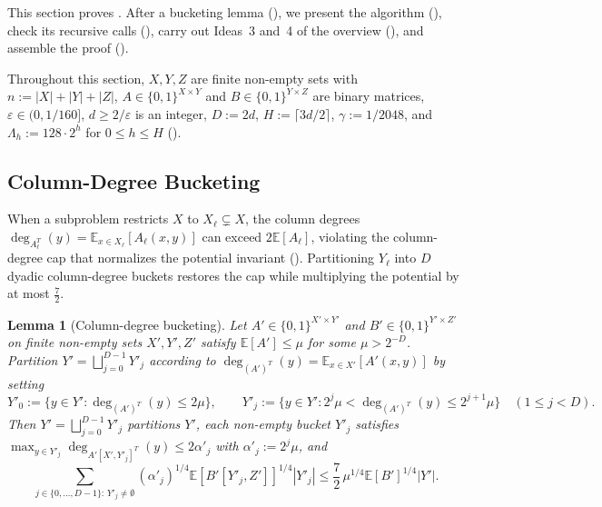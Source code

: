 \documentclass[11pt]{article}
\newtheorem{lemma}[theorem]{Lemma}
\theoremstyle{definition}
\renewcommand{\label}[1]{}%
\newcommand{\E}{\mathbb{E}}
\newcommand{\abs}[1]{\left\lvert #1 \right\rvert}
\newcommand{\dens}[1]{\E[#1]}
\begin{document}
This section proves . After a bucketing lemma (), we present the algorithm (), check its recursive calls (), carry out Ideas~3 and~4 of the overview (), and assemble the proof ().

Throughout this section, $X, Y, Z$ are finite non-empty sets with $n := \abs{X} + \abs{Y} + \abs{Z}$, $A \in \{0, 1\}^{X \times Y}$ and $B \in \{0, 1\}^{Y \times Z}$ are binary matrices, $\varepsilon \in (0, 1/160]$, $d \ge 2/\varepsilon$ is an integer, $D := 2d$, $H := \lceil 3d/2 \rceil$, $\gamma := 1/2048$, and $\Lambda_h := 128 \cdot 2^h$ for $0 \le h \le H$ ().

\subsection{Column-Degree Bucketing}
\label{sec:3d-bucketing}

When a subproblem restricts $X$ to $X_\ell \subsetneq X$, the column degrees $\deg_{A_\ell^T}(y) = \E_{x \in X_\ell}[A_\ell(x, y)]$ can exceed $2\dens{A_\ell}$, violating the column-degree cap that normalizes the potential invariant (). Partitioning $Y_\ell$ into $D$ dyadic column-degree buckets restores the cap while multiplying the potential by at most $\frac{7}{2}$.

\begin{lemma}[Column-degree bucketing]
\label{lem:dyadic-bucketing}
Let $A' \in \{0, 1\}^{X' \times Y'}$ and $B' \in \{0, 1\}^{Y' \times Z'}$ on finite non-empty sets $X', Y', Z'$ satisfy $\dens{A'} \le \mu$ for some $\mu > 2^{-D}$. Partition $Y' = \bigsqcup_{j=0}^{D-1} Y'_j$ according to $\deg_{(A')^T}(y) = \E_{x \in X'}[A'(x, y)]$ by setting
\begin{equation}\label{eq:col-bucketing}
    Y'_0 := \big\{y \in Y' : \deg_{(A')^T}(y) \le 2\mu\big\}, \qquad
    Y'_j := \big\{y \in Y' : 2^j \mu < \deg_{(A')^T}(y) \le 2^{j+1}\mu\big\} \quad (1 \le j < D).
\end{equation}
Then $Y' = \bigsqcup_{j=0}^{D-1} Y'_j$ partitions $Y'$, each non-empty bucket $Y'_j$ satisfies $\max_{y \in Y'_j}\deg_{A'[X', Y'_j]^T}(y) \le 2\alpha'_j$ with $\alpha'_j := 2^j\mu$, and
\begin{equation}\label{eq:bucketing-potential}
    \sum_{j \in \{0, \dots, D-1\} : \, Y'_j \ne \emptyset} (\alpha'_j)^{1/4}\dens{B'[Y'_j, Z']}^{1/4} \abs{Y'_j} \le \frac{7}{2} \, \mu^{1/4}\dens{B'}^{1/4} \abs{Y'}.
\end{equation}
\end{lemma}
\end{document}

